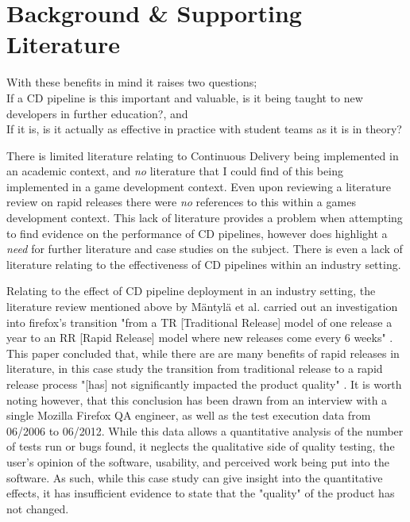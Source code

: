 \documentclass[lettersize,journal]{IEEEtran}
\begin{document}
\section{Background \& Supporting Literature}
    With these benefits in mind it raises two questions; \\
    If a CD pipeline is this important and valuable, is it being taught to new developers in further education?, and \\
    If it is, is it actually as effective in practice with student teams as it is in theory?

    There is limited literature relating to Continuous Delivery being implemented in an academic context, and \textit{no} literature that I could find of this being implemented in a game development context. Even upon reviewing a literature review on rapid releases\cite{mantyla2015rapid} there were \textit{no} references to this within a games development context. This lack of literature provides a problem when attempting to find evidence on the performance of CD pipelines, however does highlight a \textit{need} for further literature and case studies on the subject. There is even a lack of literature relating to the effectiveness of CD pipelines within an industry setting. 
    
    Relating to the effect of CD pipeline deployment in an industry setting, the literature review mentioned above by M{\"a}ntyl{\"a} et al.\cite{mantyla2015rapid} carried out an investigation into firefox's transition "from a TR [Traditional Release] model of one release a year to an RR [Rapid Release] model where new releases come every 6 weeks" \cite[pg 2]{mantyla2015rapid}. This paper concluded that, while there are are many benefits of rapid releases in literature, in this case study the transition from traditional release to a rapid release process "[has] not significantly impacted the product quality" \cite[pg 40]{mantyla2015rapid}. It is worth noting however, that this conclusion has been drawn from an interview with a single Mozilla Firefox QA engineer, as well as the test execution data from 06/2006 to 06/2012. While this data allows a quantitative analysis of the number of tests run or bugs found, it neglects the qualitative side of quality testing, the user's opinion of the software, usability, and perceived work being put into the software. As such, while this case study can give insight into the quantitative effects, it has insufficient evidence to state that the "quality" of the product has not changed\cite{kan2003metrics}.
\end{document}
